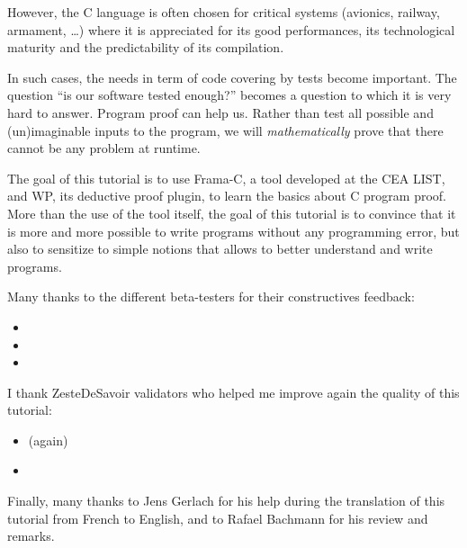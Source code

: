 However, the C language is often chosen for critical systems (avionics,
railway, armament, \ldots{}) where it is appreciated for its good
performances, its technological maturity and the predictability of its
compilation.



In such cases, the needs in term of code covering by tests become
important. The question ``is our software tested enough?'' becomes a
question to which it is very hard to answer. Program proof can help us.
Rather than test all possible and (un)imaginable inputs to the program,
we will \emph{mathematically} prove that there cannot be any problem at
runtime.



The goal of this tutorial is to use Frama-C, a tool developed at the CEA
LIST, and WP, its deductive proof plugin, to learn the basics about C
program proof. More than the use of the tool itself, the goal of this
tutorial is to convince that it is more and more possible to write
programs without any programming error, but also to sensitize to simple
notions that allows to better understand and write programs.



\begin{Information}
  Many thanks to the different beta-testers for their constructives
  feedback:

\begin{itemize}
\item {}
\item {}
\item {}
\end{itemize}
  I thank ZesteDeSavoir validators who helped me improve again the quality of
  this tutorial:

\begin{itemize}
\item {} (again)
\item {}
\end{itemize}
  Finally, many thanks to Jens Gerlach for his help during the translation of
  this tutorial from French to English, and to Rafael Bachmann for his review
  and remarks.
\end{Information}

